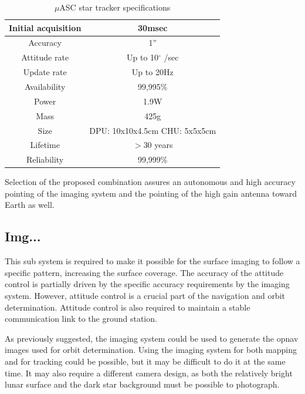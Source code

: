 \begin{table}[h!]
  \centering
    \begin{tabular}{|r|c|}
    \hline
    Initial acquisition & 30msec \bigstrut\\
    \hline
    \multicolumn{1}{|c|}{Accuracy} & 1” \bigstrut\\
    \hline
    \multicolumn{1}{|c|}{Attitude rate} & Up to 10$^{\circ}$ /sec \bigstrut\\
    \hline
    \multicolumn{1}{|c|}{Update rate} & Up to 20Hz \bigstrut\\
    \hline
    \multicolumn{1}{|c|}{Availability} & 99,995\% \bigstrut\\
    \hline
    \multicolumn{1}{|c|}{Power} & 1.9W \bigstrut\\
    \hline
    \multicolumn{1}{|c|}{Mass} & 425g \bigstrut\\
    \hline
    \multicolumn{1}{|c|}{Size} & DPU: 10x10x4.5cm CHU: 5x5x5cm \bigstrut\\
    \hline
    \multicolumn{1}{|c|}{Lifetime} & $>$30 years \bigstrut\\
    \hline
    \multicolumn{1}{|c|}{Reliability} & 99,999\% \bigstrut\\
    \hline
    \end{tabular}%
    \caption{$\mu$ASC star tracker specifications \cite {masc}}
  \label{tab:masc}%
\end{table}%
Selection of the proposed combination assures an autonomous and high accuracy pointing of the imaging system and the pointing of the high gain antenna toward Earth as well. 
\subsection*{Img...}
This sub system is required to make it possible for the surface imaging to follow a specific pattern, increasing the surface coverage. The accuracy of the attitude control is partially driven by the specific accuracy requirements by the imaging system. However, attitude control is a crucial part of the navigation and orbit determination. Attitude control is also required to maintain a stable communication link to the ground station. 

As previously suggested, the imaging system could be used to generate the opnav images used for orbit determination. Using the imaging system for both mapping and for tracking could be possible, but it may be difficult to do it at the same time. It may also require a different camera design, as both the relatively bright lunar surface and the dark star background must be possible to photograph.

